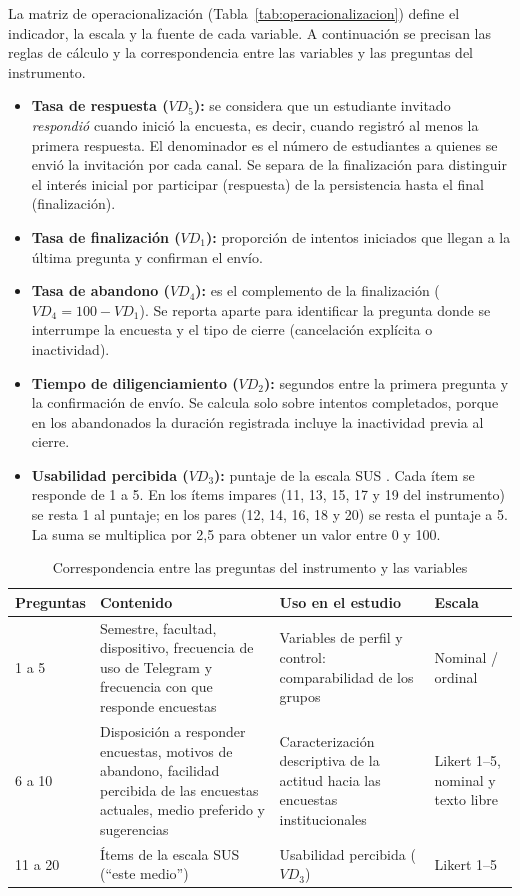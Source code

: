 \documentclass[12pt,letterpaper]{article}
\begin{document}
La matriz de operacionalización (Tabla~\ref{tab:operacionalizacion}) define el indicador, la escala y la fuente de cada variable. A continuación se precisan las reglas de cálculo y la correspondencia entre las variables y las preguntas del instrumento.

\begin{itemize}
    \item \textbf{Tasa de respuesta ($VD_5$):} se considera que un estudiante invitado \textit{respondió} cuando inició la encuesta, es decir, cuando registró al menos la primera respuesta. El denominador es el número de estudiantes a quienes se envió la invitación por cada canal. Se separa de la finalización para distinguir el interés inicial por participar (respuesta) de la persistencia hasta el final (finalización).
    \item \textbf{Tasa de finalización ($VD_1$):} proporción de intentos iniciados que llegan a la última pregunta y confirman el envío.
    \item \textbf{Tasa de abandono ($VD_4$):} es el complemento de la finalización ($VD_4 = 100 - VD_1$). Se reporta aparte para identificar la pregunta donde se interrumpe la encuesta y el tipo de cierre (cancelación explícita o inactividad).
    \item \textbf{Tiempo de diligenciamiento ($VD_2$):} segundos entre la primera pregunta y la confirmación de envío. Se calcula solo sobre intentos completados, porque en los abandonados la duración registrada incluye la inactividad previa al cierre.
    \item \textbf{Usabilidad percibida ($VD_3$):} puntaje de la escala SUS \cite{brooke1996}. Cada ítem se responde de 1 a 5. En los ítems impares (11, 13, 15, 17 y 19 del instrumento) se resta 1 al puntaje; en los pares (12, 14, 16, 18 y 20) se resta el puntaje a 5. La suma se multiplica por 2,5 para obtener un valor entre 0 y 100.
\end{itemize}

\begin{table}[htbp]
\centering
\caption{Correspondencia entre las preguntas del instrumento y las variables}
\label{tab:preguntas-variables}
\small
\begin{tabular}{|p{2cm}|p{4.5cm}|p{4.8cm}|p{2cm}|}
\hline
\textbf{Preguntas} & \textbf{Contenido} & \textbf{Uso en el estudio} & \textbf{Escala} \\ \hline
1 a 5 & Semestre, facultad, dispositivo, frecuencia de uso de Telegram y frecuencia con que responde encuestas & Variables de perfil y control: comparabilidad de los grupos & Nominal / ordinal \\ \hline
6 a 10 & Disposición a responder encuestas, motivos de abandono, facilidad percibida de las encuestas actuales, medio preferido y sugerencias & Caracterización descriptiva de la actitud hacia las encuestas institucionales & Likert 1--5, nominal y texto libre \\ \hline
11 a 20 & Ítems de la escala SUS (``este medio'') & Usabilidad percibida ($VD_3$) & Likert 1--5 \\ \hline
\end{tabular}
\end{table}
\end{document}
